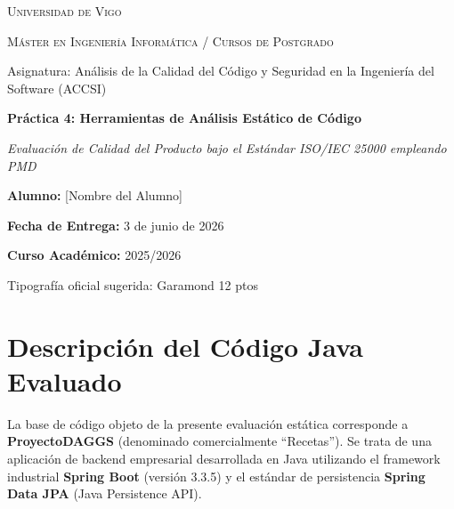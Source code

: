 \documentclass[12pt,a4paper]{article}
\begin{document}
\begin{titlepage}
    \centering
    \vspace*{1.5cm}
    {\scshape\LARGE Universidad de Vigo \par}
    \vspace{1cm}
    {\scshape\Large Máster en Ingeniería Informática / Cursos de Postgrado \par}
    \vspace{0.5cm}
    {\large Asignatura: Análisis de la Calidad del Código y Seguridad en la Ingeniería del Software (ACCSI)\par}
    \vspace{1.5cm}
    {\huge\bfseries Práctica 4: Herramientas de Análisis Estático de Código \par}
    \vspace{0.5cm}
    {\Large\itshape Evaluación de Calidad del Producto bajo el Estándar ISO/IEC 25000 empleando PMD \par}
    \vspace{2cm}
    {\large\textbf{Alumno:} [Nombre del Alumno] \par}
    \vspace{0.5cm}
    {\large\textbf{Fecha de Entrega:} 3 de junio de 2026 \par}
    \vspace{0.5cm}
    {\large\textbf{Curso Académico:} 2025/2026 \par}
    \vfill
    {\small Tipografía oficial sugerida: Garamond 12 ptos \par}
\end{titlepage}

\newpage
\tableofcontents
\newpage

\section{Descripción del Código Java Evaluado}
La base de código objeto de la presente evaluación estática corresponde a \textbf{ProyectoDAGGS} (denominado comercialmente ``Recetas''). Se trata de una aplicación de backend empresarial desarrollada en Java utilizando el framework industrial \textbf{Spring Boot} (versión 3.3.5) y el estándar de persistencia \textbf{Spring Data JPA} (Java Persistence API).
\end{document}
